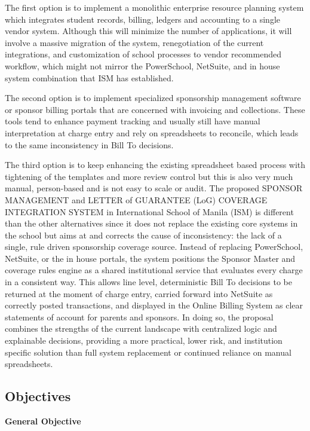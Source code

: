 \documentclass[12pt,a4paper]{article}
\begin{document}
The first option is to implement a monolithic enterprise resource planning system which integrates student records, billing, ledgers and accounting to a single vendor system. Although this will minimize the number of applications, it will involve a massive migration of the system, renegotiation of the current integrations, and customization of school processes to vendor recommended workflow, which might not mirror the PowerSchool, NetSuite, and in house system combination that ISM has established.

The second option is to implement specialized sponsorship management software or sponsor billing portals that are concerned with invoicing and collections. These tools tend to enhance payment tracking and usually still have manual interpretation at charge entry and rely on spreadsheets to reconcile, which leads to the same inconsistency in Bill To decisions.

The third option is to keep enhancing the existing spreadsheet based process with tightening of the templates and more review control but this is also very much manual, person-based and is not easy to scale or audit. The proposed SPONSOR MANAGEMENT and LETTER of GUARANTEE (LoG) COVERAGE INTEGRATION SYSTEM in International School of Manila (ISM) is different than the other alternatives since it does not replace the existing core systems in the school but aims at and corrects the cause of inconsistency: the lack of a single, rule driven sponsorship coverage source. Instead of replacing PowerSchool, NetSuite, or the in house portals, the system positions the Sponsor Master and coverage rules engine as a shared institutional service that evaluates every charge in a consistent way. This allows line level, deterministic Bill To decisions to be returned at the moment of charge entry, carried forward into NetSuite as correctly posted transactions, and displayed in the Online Billing System as clear statements of account for parents and sponsors. In doing so, the proposal combines the strengths of the current landscape with centralized logic and explainable decisions, providing a more practical, lower risk, and institution specific solution than full system replacement or continued reliance on manual spreadsheets.

\subsection{Objectives}

\textbf{General Objective}
\end{document}
